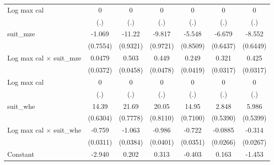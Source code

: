 {\begin{tabular}{l*{6}{c}}
\addlinespace
Log max cal         &           0         &           0         &           0         &           0         &           0         &           0         \\
                    &         (.)         &         (.)         &         (.)         &         (.)         &         (.)         &         (.)         \\
\addlinespace
suit\_mze            &      -1.069         &      -11.22\sym{***}&      -9.817\sym{***}&      -5.548\sym{***}&      -6.679\sym{***}&      -8.552\sym{***}\\
                    &    (0.7554)         &    (0.9321)         &    (0.9721)         &    (0.8509)         &    (0.6437)         &    (0.6449)         \\
\addlinespace
Log max cal $\times$ suit\_mze&      0.0479         &       0.503\sym{***}&       0.449\sym{***}&       0.249\sym{***}&       0.321\sym{***}&       0.425\sym{***}\\
                    &    (0.0372)         &    (0.0458)         &    (0.0478)         &    (0.0419)         &    (0.0317)         &    (0.0317)         \\
\addlinespace
Log max cal         &           0         &           0         &           0         &           0         &           0         &           0         \\
                    &         (.)         &         (.)         &         (.)         &         (.)         &         (.)         &         (.)         \\
\addlinespace
suit\_whe            &       14.39\sym{***}&       21.69\sym{***}&       20.05\sym{***}&       14.95\sym{***}&       2.848\sym{***}&       5.986\sym{***}\\
                    &    (0.6304)         &    (0.7778)         &    (0.8110)         &    (0.7100)         &    (0.5390)         &    (0.5399)         \\
\addlinespace
Log max cal $\times$ suit\_whe&      -0.759\sym{***}&      -1.063\sym{***}&      -0.986\sym{***}&      -0.722\sym{***}&     -0.0885\sym{***}&      -0.314\sym{***}\\
                    &    (0.0311)         &    (0.0384)         &    (0.0401)         &    (0.0351)         &    (0.0266)         &    (0.0267)         \\
\addlinespace
Constant            &      -2.940\sym{***}&       0.202         &       0.313         &      -0.403         &       0.163         &      -1.453\sym{***}\\

\end{tabular}}
